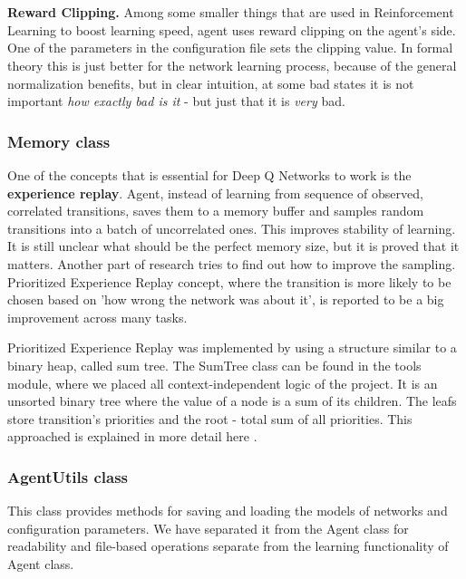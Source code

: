 \documentclass{article}
\begin{document}
\\\\
\textbf{Reward Clipping.} Among some smaller things that are used in Reinforcement Learning to boost learning speed, agent uses reward clipping on the agent's side. One of the parameters in the configuration file sets the clipping value. In formal theory this is just better for the network learning process, because of the general normalization benefits, but in clear intuition, at some bad states it is not important \textit{how exactly bad is it} - but just that it is \textit{very} bad.

\subsubsection{Memory class}
One of the concepts that is essential for Deep Q Networks to work is the \textbf{experience replay}. Agent, instead of learning from sequence of observed, correlated transitions, saves them to a memory buffer and samples random transitions into a batch of uncorrelated ones. This improves stability of learning. It is still unclear what should be the perfect memory size, but it is proved that it matters. Another part of research tries to find out how to improve the sampling. Prioritized Experience Replay concept, where the transition is more likely to be chosen based on 'how wrong the network was about it', is reported to be a big improvement across many tasks.

Prioritized Experience Replay \cite{per_paper} was implemented by using a structure similar to a binary heap, called sum tree. The SumTree class can be found in the tools module, where we placed all context-independent logic of the project. It is an unsorted binary tree where the value of a node is a sum of its children. The leafs store transition's priorities and the root - total sum of all priorities. This approached is explained in more detail here \cite{dqn_per_post}.

\subsubsection{AgentUtils class}
This class provides methods for saving and loading the models of networks and configuration parameters. We have separated it from the Agent class for readability and file-based operations separate from the learning functionality of Agent class.
\end{document}
